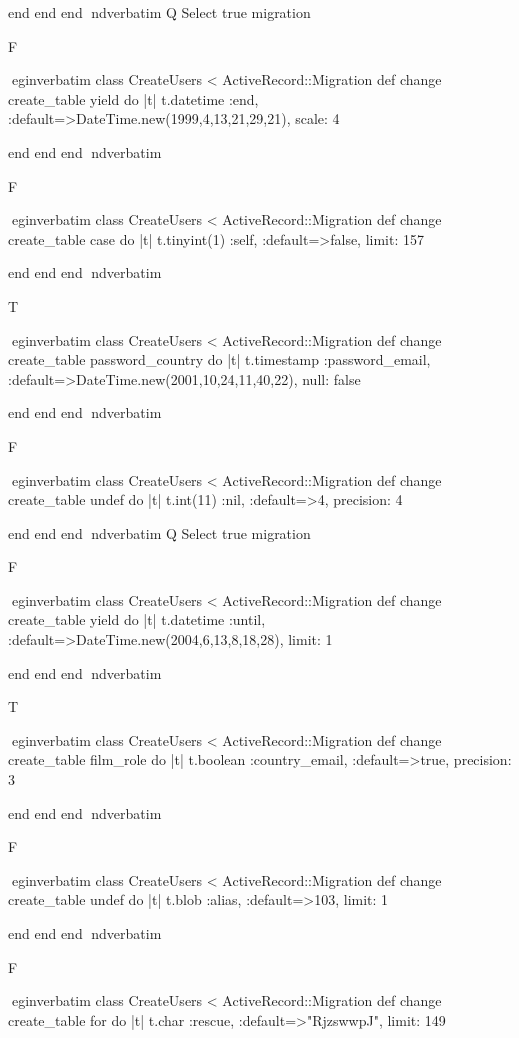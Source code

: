     end 
  end 
end
nd{verbatim}
Q
 Select true migration

F

egin{verbatim}
 class CreateUsers < ActiveRecord::Migration 
  def change 
    create_table yield do |t| 
      t.datetime :end, :default=>DateTime.new(1999,4,13,21,29,21), scale: 4
    
    end 
  end 
end
nd{verbatim}

F

egin{verbatim}
 class CreateUsers < ActiveRecord::Migration 
  def change 
    create_table case do |t| 
      t.tinyint(1) :self, :default=>false, limit: 157
    
    end 
  end 
end
nd{verbatim}

T

egin{verbatim}
 class CreateUsers < ActiveRecord::Migration 
  def change 
    create_table password_country do |t| 
      t.timestamp :password_email, :default=>DateTime.new(2001,10,24,11,40,22), null: false
    
    end 
  end 
end
nd{verbatim}

F

egin{verbatim}
 class CreateUsers < ActiveRecord::Migration 
  def change 
    create_table undef do |t| 
      t.int(11) :nil, :default=>4, precision: 4
    
    end 
  end 
end
nd{verbatim}
Q
 Select true migration

F

egin{verbatim}
 class CreateUsers < ActiveRecord::Migration 
  def change 
    create_table yield do |t| 
      t.datetime :until, :default=>DateTime.new(2004,6,13,8,18,28), limit: 1
    
    end 
  end 
end
nd{verbatim}

T

egin{verbatim}
 class CreateUsers < ActiveRecord::Migration 
  def change 
    create_table film_role do |t| 
      t.boolean :country_email, :default=>true, precision: 3
    
    end 
  end 
end
nd{verbatim}

F

egin{verbatim}
 class CreateUsers < ActiveRecord::Migration 
  def change 
    create_table undef do |t| 
      t.blob :alias, :default=>103, limit: 1
    
    end 
  end 
end
nd{verbatim}

F

egin{verbatim}
 class CreateUsers < ActiveRecord::Migration 
  def change 
    create_table for do |t| 
      t.char :rescue, :default=>"RjzswwpJ", limit: 149
    
